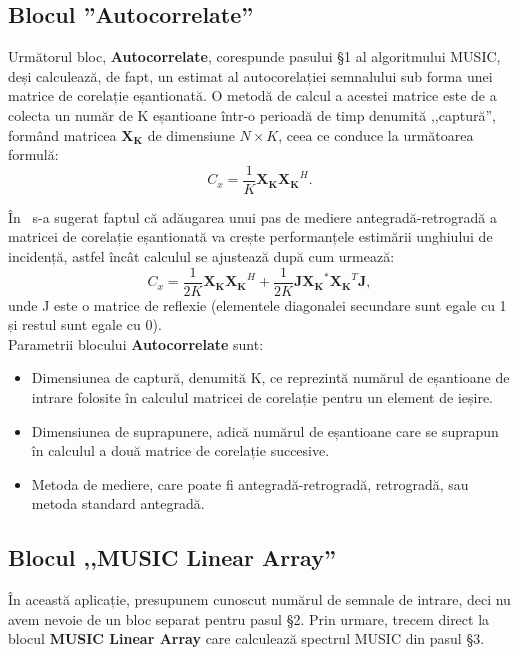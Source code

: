 \subsection{Blocul ''Autocorrelate''}
\label{ssec:autocorrelate-block}
Următorul bloc, \textbf{Autocorrelate}, corespunde pasului \S1 al algoritmului
MUSIC, deși calculează, de fapt, un estimat al autocorelației semnalului sub
forma unei matrice de corelație eșantionată. O metodă de calcul a acestei
matrice este de a colecta un număr de K eșantioane într-o perioadă de timp
denumită ,,captură'', formând matricea $\bm{X_K}$ de dimensiune $N \times K$,
ceea ce conduce la următoarea formulă:
\begin{equation}
C_x = \frac{1}{K}\bm{X_K}\bm{X_K}^H.
\label{eq:autocorr-first-part}
\end{equation}

În~\cite{fb-averaging} s-a sugerat faptul că adăugarea unui pas de mediere
antegradă-retrogradă a matricei de corelație eșantionată va crește performanțele
estimării unghiului de incidență, astfel încât calculul se ajustează după cum
urmează:
\begin{equation}
C_x = \frac{1}{2K}\bm{X_K}\bm{X_K}^H + \frac{1}{2K}\bm{J}\bm{X_K}^*\bm{X_K}^T\bm{J},
\end{equation}
unde J este o matrice de reflexie (elementele diagonalei secundare sunt egale cu
1 și restul sunt egale cu 0). \\

Parametrii blocului \textbf{Autocorrelate} sunt:
\begin{itemize}
    \item Dimensiunea de captură, denumită K, ce reprezintă numărul de
    eșantioane de intrare folosite în calculul matricei de corelație pentru un
    element de ieșire.
    \item Dimensiunea de suprapunere, adică numărul de eșantioane care se
    suprapun în calculul a două matrice de corelație succesive.
    \item Metoda de mediere, care poate fi antegradă-retrogradă, retrogradă, sau metoda
    standard antegradă.
\end{itemize}

\subsection{Blocul ,,MUSIC Linear Array''}
\label{ssec:music-lin-array}
În această aplicație, presupunem cunoscut numărul de semnale de intrare, deci nu
avem nevoie de un bloc separat pentru pasul \S2. Prin urmare, trecem direct la
blocul \textbf{MUSIC Linear Array} care calculează spectrul MUSIC din pasul \S3.
\\

